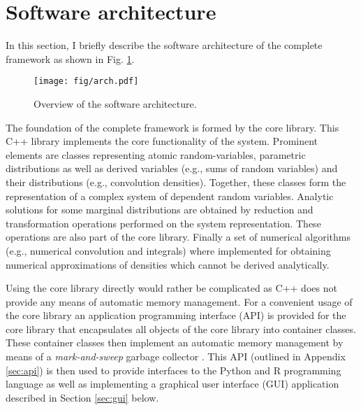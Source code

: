 \section{Software architecture}
In this section, I briefly describe the software architecture of the complete 
framework as shown in Fig. \ref{fig:arch}. 

\begin{figure} [!ht]
 \centering
 \texttt{[image: fig/arch.pdf]}
 \caption{Overview of the  software architecture.} \label{fig:arch}
\end{figure}

The foundation of the complete framework is formed by the  core library. This C++
library implements the core functionality of the system. Prominent elements are classes
representing atomic random-variables, parametric distributions as well as derived
variables (e.g., sums of random variables) and their distributions (e.g., convolution densities).  
Together, these classes form the representation of a complex system of dependent random variables.
Analytic solutions for some marginal distributions are obtained by reduction and transformation
operations performed on the system representation. These operations are also part of the core
library. Finally a set of numerical algorithms (e.g., numerical convolution and integrals) where
implemented for obtaining numerical approximations of densities which cannot
be derived analytically. 

Using the core library directly would rather be complicated as C++ does not provide any means of automatic
memory management. For a convenient usage of the core library an application programming interface
(API) is provided for the core library that encapsulates all objects of the core library into
container classes. These container classes then implement an automatic memory management by
means of a \emph{mark-and-sweep} garbage collector \cite[e.g.,][]{Aho2007}. This API (outlined
in Appendix \ref{sec:api}) is then used to provide interfaces to the Python and R programming
language as well as implementing a graphical user interface (GUI) application described in Section 
\ref{sec:gui} below.